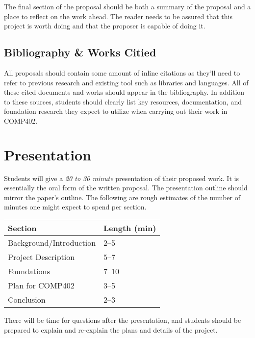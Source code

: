 \documentclass[nobib]{tufte-handout}
\begin{document}
The final section of the proposal should be both a summary of the proposal and a place to reflect on the work ahead. The reader needs to be assured that this project is worth doing and that the proposer is capable of doing it.


\subsection{Bibliography \& Works Citied}

All proposals should contain some amount of inline citations as they'll need to refer to previous research and existing tool such as libraries and languages. All of these cited documents and works should appear in the bibliography. In addition to these sources, students should clearly list key resources, documentation, and foundation research they expect to utilize when carrying out their work in COMP402.

\section{Presentation}

Students will give a \textit{20 to 30 minute} presentation of their proposed work. It is essentially the oral form of the written proposal. The presentation outline should mirror the paper's outline. The following are rough estimates of the number of minutes one might expect to spend per section.
\begin{center}
  \begin{tabular}{ll}
    Section & Length (min) \\ \toprule
    Background/Introduction & 2--5 \\
    Project Description & 5--7 \\
    Foundations & 7--10 \\
    Plan for COMP402 & 3--5 \\
    Conclusion & 2--3
  \end{tabular}
\end{center}

There will be time for questions after the presentation, and students should be prepared to explain and re-explain the plans and details of the project.
\end{document}

